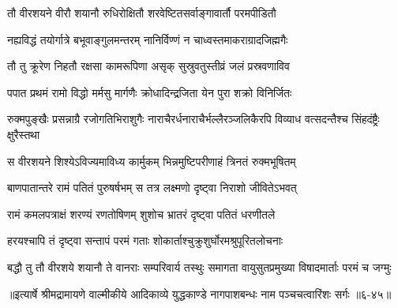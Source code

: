 \twolineshloka
{तौ वीरशयने वीरौ शयानौ रुधिरोक्षितौ}
{शरवेष्टितसर्वाङ्गावार्तौ परमपीडितौ} %

\twolineshloka
{नह्यविद्धं तयोर्गात्रे बभूवाङ्गुलमन्तरम्}
{नानिर्विण्णं न चाध्वस्तमाकराग्रादजिह्मगैः} %

\twolineshloka
{तौ तु क्रूरेण निहतौ रक्षसा कामरूपिणा}
{असृक् सुस्रुवतुस्तीव्रं जलं प्रस्रवणाविव} %

\twolineshloka
{पपात प्रथमं रामो विद्धो मर्मसु मार्गणैः}
{क्रोधादिन्द्रजिता येन पुरा शक्रो विनिर्जितः} %

\threelineshloka
{रुक्मपुङ्खैः प्रसन्नाग्रै रजोगतिभिराशुगैः}
{नाराचैरर्धनाराचैर्भल्लैरञ्जलिकैरपि}
{विव्याध वत्सदन्तैश्च सिंहदंष्ट्रैः क्षुरैस्तथा} %

\twolineshloka
{स वीरशयने शिश्येऽविज्यमाविध्य कार्मुकम्}
{भिन्नमुष्टिपरीणाहं त्रिनतं रुक्मभूषितम्} %

\twolineshloka
{बाणपातान्तरे रामं पतितं पुरुषर्षभम्}
{स तत्र लक्ष्मणो दृष्ट्वा निराशो जीवितेऽभवत्} %

\twolineshloka
{रामं कमलपत्राक्षं शरण्यं रणतोषिणम्}
{शुशोच भ्रातरं दृष्ट्वा पतितं धरणीतले} %

\twolineshloka
{हरयश्चापि तं दृष्ट्वा सन्तापं परमं गताः}
{शोकार्ताश्चुक्रुशुर्घोरमश्रुपूरितलोचनाः} %

\twolineshloka
{बद्धौ तु तौ वीरशये शयानौ ते वानराः सम्परिवार्य तस्थुः}
{समागता वायुसुतप्रमुख्या विषादमार्ताः परमं च जग्मुः} %


॥इत्यार्षे श्रीमद्रामायणे वाल्मीकीये आदिकाव्ये युद्धकाण्डे नागपाशबन्धः नाम पञ्चचत्वारिंशः सर्गः ॥६-४५॥
